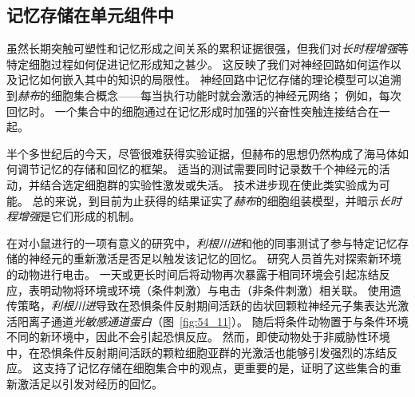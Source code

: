 \subsection{记忆存储在单元组件中}

虽然长期突触可塑性和记忆形成之间关系的累积证据很强，但我们对\textit{长时程增强}等特定细胞过程如何促进记忆形成知之甚少。
这反映了我们对神经回路如何运作以及记忆如何嵌入其中的知识的局限性。
神经回路中记忆存储的理论模型可以追溯到\textit{赫布}的细胞集合概念——每当执行功能时就会激活的神经元网络；
例如，每次回忆时。
一个集合中的细胞通过在记忆形成时加强的兴奋性突触连接结合在一起。


半个多世纪后的今天，尽管很难获得实验证据，但赫布的思想仍然构成了海马体如何调节记忆的存储和回忆的框架。
适当的测试需要同时记录数千个神经元的活动，并结合选定细胞群的实验性激发或失活。
技术进步现在使此类实验成为可能。
总的来说，到目前为止获得的结果证实了\textit{赫布}的细胞组装模型，并暗示\textit{长时程增强}是它们形成的机制。


在对小鼠进行的一项有意义的研究中，\textit{利根川进}和他的同事测试了参与特定记忆存储的神经元的重新激活是否足以触发该记忆的回忆。
研究人员首先对探索新环境的动物进行电击。
一天或更长时间后将动物再次暴露于相同环境会引起冻结反应，表明动物将环境或环境（条件刺激）与电击（非条件刺激）相关联。
使用遗传策略，\textit{利根川进}导致在恐惧条件反射期间活跃的齿状回颗粒神经元子集表达光激活阳离子通道\textit{光敏感通道蛋白}（图~\ref{fig:54_11}）。
随后将条件动物置于与条件环境不同的新环境中，因此不会引起恐惧反应。
然而，即使动物处于非威胁性环境中，在恐惧条件反射期间活跃的颗粒细胞亚群的光激活也能够引发强烈的冻结反应。
这支持了记忆存储在细胞集合中的观点，更重要的是，证明了这些集合的重新激活足以引发对经历的回忆。


